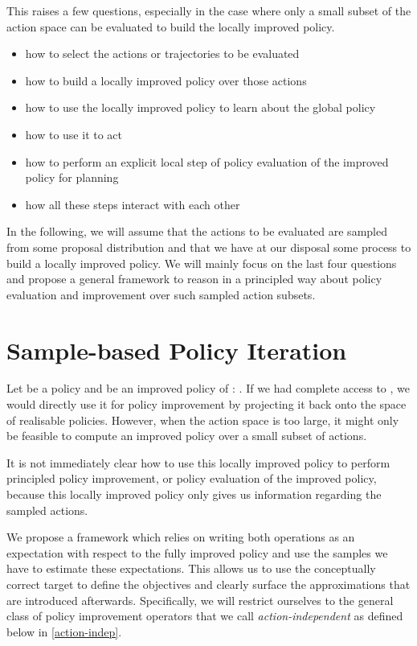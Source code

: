 \documentclass{article}
\begin{document}
This raises a few questions, especially in the case where only a small subset of the action space can be evaluated to build  the locally improved policy.
\begin{itemize}[topsep=2pt,itemsep=2pt,parsep=0pt]
\item how to select the actions or trajectories to be evaluated
\item how to build a locally improved policy over those actions
\item how to use the locally improved policy to learn about the global policy
\item how to use it to act
\item how to perform an explicit local step of policy evaluation of the improved policy for planning
\item how all these steps interact with each other
\end{itemize}

In the following, we will assume that the actions to be evaluated are sampled from some proposal distribution  and that we have at our disposal some process to build a locally improved policy. We will mainly focus on the last four questions and propose a general framework to reason in a principled way about policy evaluation and improvement over such sampled action subsets.





\section{Sample-based Policy Iteration}
\label{sample-based-policy-improvement}
Let  be a policy and  be an improved policy of : . If we had complete access to , we would directly use it for policy improvement by projecting it back onto the space of realisable policies. However, when the action space  is too large, it might only be feasible to compute an improved policy over a small subset of actions.

It is not immediately clear how to use this locally improved policy to perform principled policy improvement, or policy evaluation of the improved policy, because this locally improved policy only gives us information regarding the sampled actions.

We propose a framework which relies on writing both operations as an expectation with respect to the fully improved policy  and use the samples we have to estimate these expectations. This allows us to use the conceptually correct target  to define the objectives and clearly surface the approximations that are introduced afterwards. Specifically, we will restrict ourselves to the general class of policy improvement operators that we call \emph{action-independent} as defined below in \ref{action-indep}.
\end{document}
